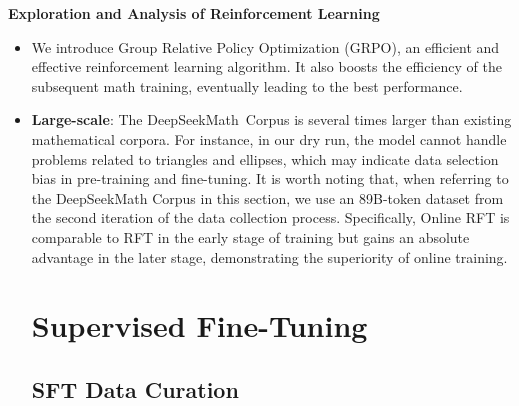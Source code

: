\begin{algorithm}[t]
\begin{algorithmic}[1]
\textbf{Exploration and Analysis of Reinforcement Learning}

\begin{itemize}[topsep=0pt]
    \item We introduce Group Relative Policy Optimization (GRPO), an efficient and effective reinforcement learning algorithm. It also boosts the efficiency of the subsequent math training, eventually leading to the best performance. \item \textbf{Large-scale}:
    The DeepSeekMath~Corpus is several times larger than existing mathematical corpora. For instance, in our dry run, the model cannot handle problems related to triangles and ellipses, which may indicate data selection bias in pre-training and fine-tuning. It is worth noting that, when referring to the DeepSeekMath Corpus in this section, we use an 89B-token dataset from the second iteration of the data collection process. Specifically, Online RFT is comparable to RFT in the early stage of training but gains an absolute advantage in the later stage, demonstrating the superiority of online training. \section{Supervised Fine-Tuning}

\subsection{SFT Data Curation}


\end{itemize}
\end{algorithmic}
\end{algorithm}
